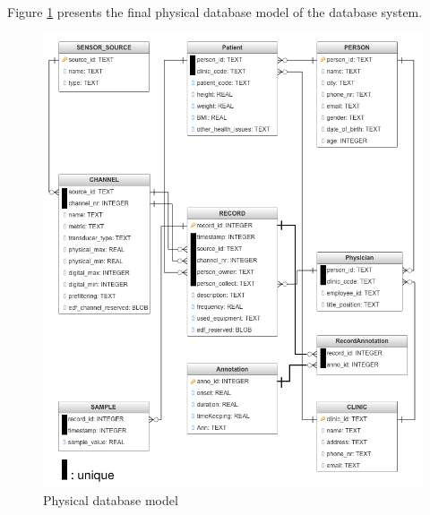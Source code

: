 Figure \ref{fig:Figures/FinalTable} presents the final physical database model of the database system.
\begin{figure}[ht]
    \centering
    \includegraphics[width=1.0\textwidth]{Figures/FinalTable.png}
    \caption{Physical database model}
    \label{fig:Figures/FinalTable}
\end{figure}







